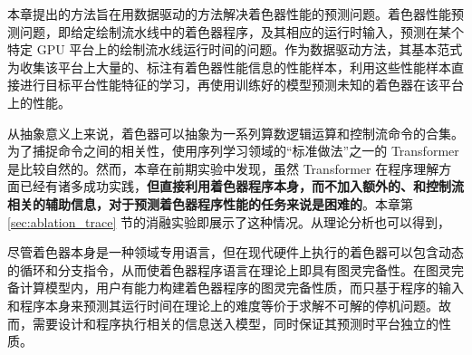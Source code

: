 \label{sec:design_decisions}

{\amend 本章提出的方法旨在用数据驱动的方法解决着色器性能的预测问题。着色器性能预测问题，即给定绘制流水线中的着色器程序，及其相应的运行时输入，预测在某个特定 GPU 平台上的绘制流水线运行时间的问题。作为数据驱动方法，其基本范式为收集该平台上大量的、标注有着色器性能信息的性能样本，利用这些性能样本直接进行目标平台性能特征的学习，再使用训练好的模型预测未知的着色器在该平台上的性能。

从抽象意义上来说，着色器可以抽象为一系列算数逻辑运算和控制流命令的合集。为了捕捉命令之间的相关性，使用序列学习领域的“标准做法”之一的 Transformer 是比较自然的。然而，本章在前期实验中发现，虽然 Transformer 在程序理解方面已经有诸多成功实践，{\bf 但直接利用着色器程序本身，而不加入额外的、和控制流相关的辅助信息，对于预测着色器程序性能的任务来说是困难的}。本章第 \ref{sec:ablation_trace} 节的消融实验即展示了这种情况。从理论分析也可以得到，}尽管着色器本身是一种领域专用语言，但在现代硬件上执行的着色器可以包含动态的循环和分支指令，从而使着色器程序语言在理论上即具有图灵完备性。在图灵完备计算模型内，用户有能力构建着色器程序的图灵完备性质，而只基于程序的输入和程序本身来预测其运行时间在理论上的难度等价于求解不可解的停机问题\cite{10.1112/plms/s2-42.1.230}。{\amend 故而，需要设计和程序执行相关的信息送入模型，同时保证其预测时平台独立的性质。}

